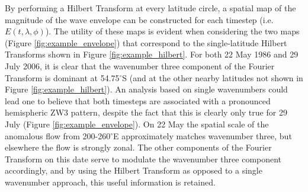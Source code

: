 By performing a Hilbert Transform at every latitude circle, a spatial map of the magnitude of the wave envelope can be constructed for each timestep (i.e. $E(t,\lambda,\phi)$). The utility of these maps is evident when considering the two maps (Figure \ref{fig:example_envelope}) that correspond to the single-latitude Hilbert Transforms shown in Figure \ref{fig:example_hilbert}. For both 22 May 1986 and 29 July 2006, it is clear that the wavenumber three component of the Fourier Transform is dominant at 54.75$^{\circ}$S (and at the other nearby latitudes not shown in Figure \ref{fig:example_hilbert}). An analysis based on single wavenumbers could lead one to believe that both timesteps are associated with a pronounced hemispheric ZW3 pattern, despite the fact that this is clearly only true for 29 July (Figure \ref{fig:example_envelope}). On 22 May the spatial scale of the anomalous flow from 200-260$^{\circ}$E approximately matches wavenumber three, but elsewhere the flow is strongly zonal. The other components of the Fourier Transform on this date serve to modulate the wavenumber three component accordingly, and by using the Hilbert Transform as opposed to a single wavenumber approach, this useful information is retained.

